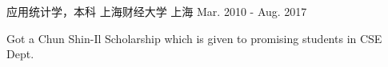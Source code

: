 

\begin{cventries}

  \cventry
    {应用统计学，本科} %
    {上海财经大学} %
    {上海} %
    {Mar. 2010 - Aug. 2017} %
    {
      \begin{cvitems} %
        \item {Got a Chun Shin-Il Scholarship which is given to promising students in CSE Dept.}
      \end{cvitems}
    }

\end{cventries}
